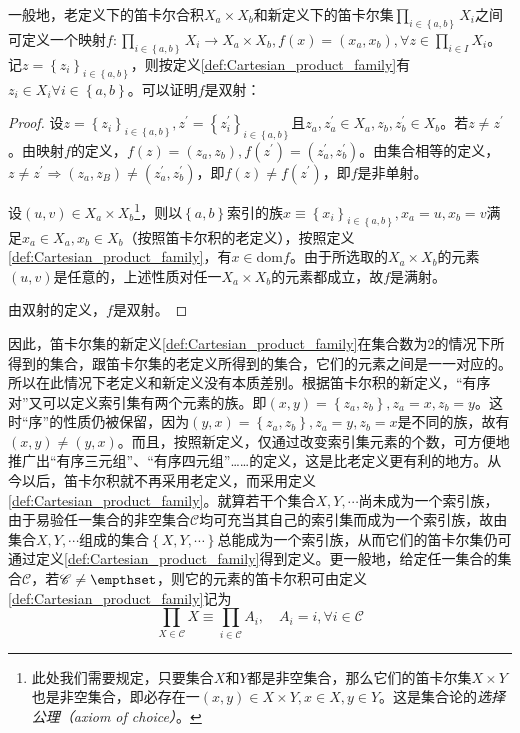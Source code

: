 \documentclass[../main.tex]{subfiles}
\begin{document}
一般地，老定义下的笛卡尔合积$X_a\times X_b$和新定义下的笛卡尔集$\prod_{i\in\left\{a,b\right\}}X_i$之间可定义一个映射$f:\prod_{i\in\left\{a,b\right\}}X_i\rightarrow X_a\times X_b,f\left(x\right)=\left(x_a,x_b\right),\forall z\in\prod_{i\in I}X_i$。记$z=\left\{z_i\right\}_{i\in\left\{a,b\right\}}$，则按定义\ref{def:Cartesian_product_family}有$z_i\in X_i\forall i\in\left\{a,b\right\}$。可以证明$f$是双射：
\begin{proof}
    设$z=\left\{z_i\right\}_{i\in\left\{a,b\right\}},z^\prime=\left\{z^\prime_i\right\}_{i\in\left\{a,b\right\}}$且$z_a,z^\prime_a\in X_a,z_b,z^\prime_b\in X_b$。若$z\neq z^\prime$。由映射$f$的定义，$f\left(z\right)=\left(z_a,z_b\right),f\left(z^\prime\right)=\left(z^\prime_a,z^\prime_b\right)$。由集合相等的定义，$z\neq z^\prime\Rightarrow\left(z_a,z_B\right)\neq\left(z^\prime_a,z^\prime_b\right)$，即$f\left(z\right)\neq f\left(z^\prime\right)$，即$f$是非单射。

    设$\left(u,v\right)\in X_a\times X_b$\footnote{此处我们需要规定，只要集合$X$和$Y$都是非空集合，那么它们的笛卡尔集$X\times Y$也是非空集合，即必存在一$\left(x,y\right)\in X\times Y,x\in X,y\in Y$。这是集合论的\emph{选择公理（axiom of choice）}。}，则以$\left\{a,b\right\}$索引的族$x\equiv\left\{x_i\right\}_{i\in\left\{a,b\right\}},x_a=u,x_b=v$满足$x_a\in X_a,x_b\in X_b$（按照笛卡尔积的老定义），按照定义\ref{def:Cartesian_product_family}，有$x\in\mathrm{dom}f$。由于所选取的$X_a\times X_b$的元素$\left(u,v\right)$是任意的，上述性质对任一$X_a\times X_b$的元素都成立，故$f$是满射。

    由双射的定义，$f$是双射。
\end{proof}

因此，笛卡尔集的新定义\ref{def:Cartesian_product_family}在集合数为2的情况下所得到的集合，跟笛卡尔集的老定义所得到的集合，它们的元素之间是一一对应的。所以在此情况下老定义和新定义没有本质差别。根据笛卡尔积的新定义，“有序对”又可以定义索引集有两个元素的族。即$\left(x,y\right)=\left\{z_a,z_b\right\},z_a=x,z_b=y$。这时“序”的性质仍被保留，因为$\left(y,x\right)=\left\{z_a,z_b\right\},z_a=y,z_b=x$是不同的族，故有$\left(x,y\right)\neq\left(y,x\right)$。而且，按照新定义，仅通过改变索引集元素的个数，可方便地推广出“有序三元组”、“有序四元组”……的定义，这是比老定义更有利的地方。从今以后，笛卡尔积就不再采用老定义，而采用定义\ref{def:Cartesian_product_family}。就算若干个集合$X,Y,\cdots$尚未成为一个索引族，由于易验任一集合的非空集合$\mathcal{C}$均可充当其自己的索引集而成为一个索引族，故由集合$X,Y,\cdots$组成的集合$\left\{X,Y,\cdots\right\}$总能成为一个索引族，从而它们的笛卡尔集仍可通过定义\ref{def:Cartesian_product_family}得到定义。更一般地，给定任一集合的集合$\mathcal{C}$，若$\mathcal{C}\neq\empthset$，则它的元素的笛卡尔积可由定义\ref{def:Cartesian_product_family}记为
\[
    \prod_{X\in\mathcal{C}}X\equiv\prod_{i\in\mathcal{C}}A_i,\quad A_i=i,\forall i\in\mathcal{C}
\]
\end{document}
